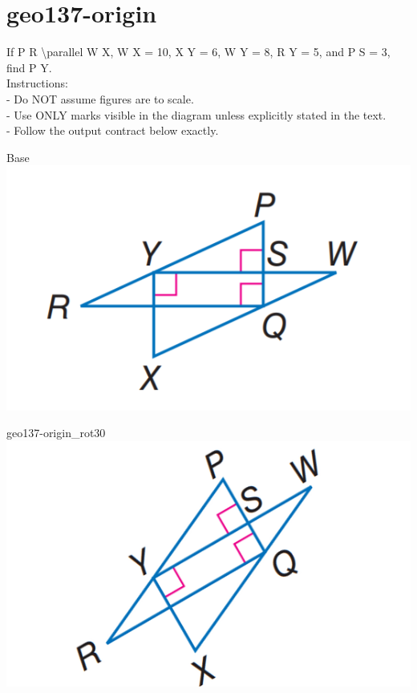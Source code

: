 \documentclass[12pt]{article}
\begin{document}
\section*{geo137-origin}
\noindent\begin{minipage}{\textwidth}
\setlength{\parskip}{4pt}
If P R \textbackslash{}parallel W X, W X = 10, X Y = 6, W Y = 8, R Y = 5, and P S = 3, find P Y.\\
Instructions:\\
- Do NOT assume figures are to scale.\\
- Use ONLY marks visible in the diagram unless explicitly stated in the text.\\
- Follow the output contract below exactly.\\
\end{minipage}
\begin{center}
\begin{minipage}{0.32\textwidth}\centering
Base\\
\includegraphics[width=0.95\linewidth]{out_rommath_origin/items/geo137-origin/assets/figure.png}
\end{minipage}
\hfill\begin{minipage}{0.32\textwidth}\centering
geo137-origin\_rot30\\
\includegraphics[width=0.95\linewidth]{out_rommath_origin/items/geo137-origin/assets/figure_rot30.png}

\end{minipage}
\end{center}
\end{document}
